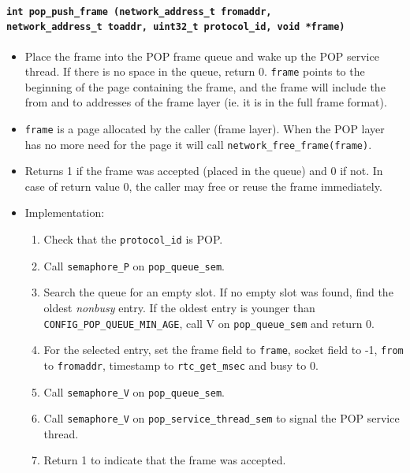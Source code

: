 \documentclass[twoside,a4paper]{report}
\makeatletter
\newenvironment{function}[3]{%
\paragraph{\texttt{#1 {\textbf{#2}} (#3)}}%
\index{#2@\texttt{#2}}%
\begin{itemize}%
}{%
\end{itemize}%
}
\newcommand{\brtab}{\\\hspace*{1cm}}
\makeatother
\begin{document}
\begin{function}{int}{pop\_push\_frame}{network\_address\_t fromaddr,
   \brtab network\_address\_t toaddr, uint32\_t protocol\_id, void *frame}

\item Place the frame into the POP frame queue and wake up the POP
service thread. If there is no space in the queue, return
0. \texttt{frame} points to the beginning of the page containing the
frame, and the frame will include the from and to addresses of the
frame layer (ie. it is in the full frame format).

\item \texttt{frame} is a page allocated by the caller (frame
layer). When the POP layer has no more need for the page it will call
\texttt{network\_free\_frame(frame)}.

\item Returns 1 if the frame was accepted (placed in the queue) and 0
if not. In case of return value 0, the caller may free or reuse the
frame immediately.

\item Implementation:
\begin{enumerate}
\item Check that the \texttt{protocol\_id} is POP.
\item Call \texttt{semaphore\_P} on \texttt{pop\_queue\_sem}.
\item Search the queue for an empty slot. If no empty slot was found,
find the oldest \emph{nonbusy} entry. If the oldest entry is younger
than
\texttt{CONFIG\_POP\_QUEUE\_MIN\_AGE},
call V on \texttt{pop\_queue\_sem} and return 0.

\item For the selected entry, set the frame field to \texttt{frame},
socket field to -1, \texttt{from} to \texttt{fromaddr}, timestamp to
\texttt{rtc\_get\_msec} and busy to 0.

\item Call \texttt{semaphore\_V} on \texttt{pop\_queue\_sem}.

\item Call \texttt{semaphore\_V} on \texttt{pop\_service\_thread\_sem}
  to signal the POP service thread.

\item Return 1 to indicate that the frame was accepted.

\end{enumerate}

\end{function}
\end{document}
